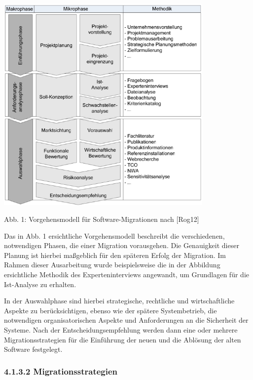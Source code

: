 \documentclass[a4paper]{article}
\begin{document}
\bigskip

{\centering  \includegraphics[width=10.629cm,height=10.781cm]{INMEA5BeckmannMarco-img001.png} \par}
{\centering\sffamily
Abb. 1: Vorgehensmodell für Software-Migrationen nach [Rog12]
\par}


\bigskip

{\sffamily
Das in Abb. 1 ersichtliche Vorgehensmodell beschreibt die verschiedenen, notwendigen Phasen, die einer Migration
vorausgehen. Die Genauigkeit dieser Planung ist hierbei maßgeblich für den späteren Erfolg der Migration. Im Rahmen
dieser Ausarbeitung wurde beispielsweise die in der Abbildung ersichtliche Methodik des Experteninterviews angewandt,
um Grundlagen für die Ist-Analyse zu erhalten.}


\bigskip

{\sffamily
In der Auswahlphase sind hierbei strategische, rechtliche und wirtschaftliche Aspekte zu berücksichtigen, ebenso wie der
spätere Systembetrieb, die notwendigen organisatorischen Aspekte und Anforderungen an die Sicherheit der Systeme. Nach
der Entscheidungsempfehlung werden dann eine oder mehrere Migrationsstrategien für die Einführung der neuen und die
Ablösung der alten Software festgelegt.}


\bigskip

\subsubsection[4.1.3.2 Migrationsstrategien]{\textbf{4.1.3.2 Migrationsstrategien}}
\end{document}
